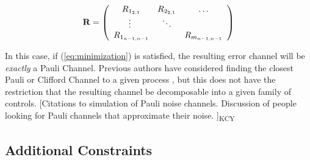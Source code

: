 \documentclass[aps,nofootinbib,pra,notitlepage,twocolumn]{revtex4-1}
\newcommand{\kcy}[1]{{\color{red}[#1]\textsubscript{\rm{KCY}}}}
\begin{document}
\begin{equation}\label{eq:vectorized_off_diagonal}
	\bold{R} = \left(\begin{array}{cccc}
		R_{1_{2,1}} & R_{2_{2,1}} & \ldots   \\ 
		\vdots\ & \ddots &    \\
		R_{1_{n-1,n-1}} &  &  R_{m_{n-1,n-1}} \\ 
	\end{array} 	
	\right)
\end{equation}

In this case, if (\ref{eq:minimization}) is satisfied, the resulting error channel will be \textit{exactly} a Pauli Channel. Previous authors have considered finding the closest Pauli or Clifford Channel to a given process \cite{Magesan2013}, but this does not have the restriction that the resulting channel be decomposable into a given family of controls. \kcy{Citations to simulation of Pauli noise channels. Discussion of people looking for Pauli channels that approximate their noise. }


\subsection{Additional Constraints}
\end{document}
